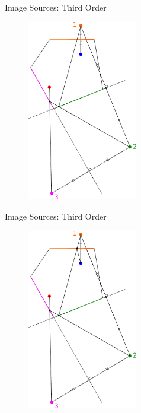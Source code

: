 \documentclass{beamer}
\begin{document}
\begin{frame}{Image Sources: Third Order}

\begin{figure}[t]
	\centering
    \includegraphics[width=0.43\textwidth]{ImageSources2MultiDrawn3.pdf}
\end{figure}

\end{frame}

\begin{frame}{Image Sources: Third Order}

\begin{figure}[t]
	\centering
    \includegraphics[width=0.43\textwidth]{ImageSources2MultiDrawn4.pdf}
\end{figure}

\end{frame}
\end{document}
